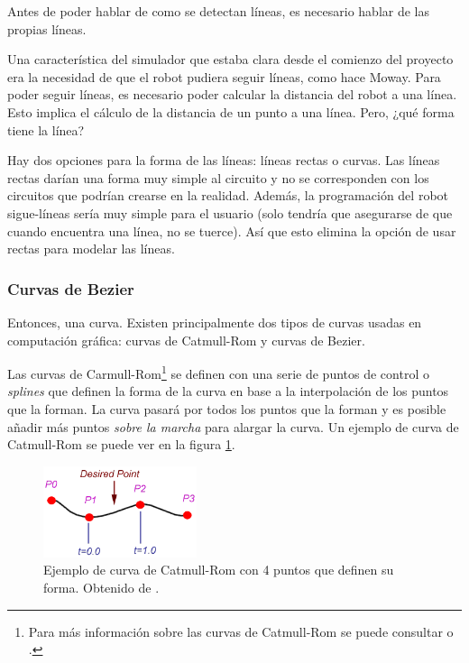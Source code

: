 Antes de poder hablar de como se detectan líneas, es necesario hablar de las propias líneas.

Una característica del simulador que estaba clara desde el comienzo del proyecto era la necesidad de que el robot pudiera seguir líneas, como hace Moway. Para poder seguir líneas, es necesario poder calcular la distancia del robot a una línea. Esto implica el cálculo de la distancia de un punto a una línea. Pero, ¿qué forma tiene la línea?

Hay dos opciones para la forma de las líneas: líneas rectas o curvas. Las líneas rectas darían una forma muy simple al circuito y no se corresponden con los circuitos que podrían crearse en la realidad. Además, la programación del robot sigue-líneas sería muy simple para el usuario (solo tendría que asegurarse de que cuando encuentra una línea, no se tuerce). Así que esto elimina la opción de usar rectas para modelar las líneas. 


\subsubsection{Curvas de Bezier}
\label{bezier}

Entonces, una curva. Existen principalmente dos tipos de curvas usadas en computación gráfica: curvas de Catmull-Rom y curvas de Bezier. 

Las curvas de Carmull-Rom\footnote{Para más información sobre las curvas de Catmull-Rom se puede consultar \cite{curves-catmull-rom-introduction} o \cite{catmull-rom-splines}.} se definen con una serie de puntos de control o \emph{splines} que definen la forma de la curva en base a la interpolación de los puntos que la forman. La curva pasará por todos los puntos que la forman y es posible añadir más puntos \emph{sobre la marcha} para alargar la curva. Un ejemplo de curva de Catmull-Rom se puede ver en la figura \ref{fig:curva-catmull}.


\begin{figure}[!ht]
	\begin{centering}
		\includegraphics[width=0.4\textwidth]{images/curva-catmull.png}
			\caption{Ejemplo de curva de Catmull-Rom con 4 puntos que definen su forma. Obtenido de \cite{curves-catmull-rom-introduction}.}
				\label{fig:curva-catmull}
	\end{centering}
\end{figure}


